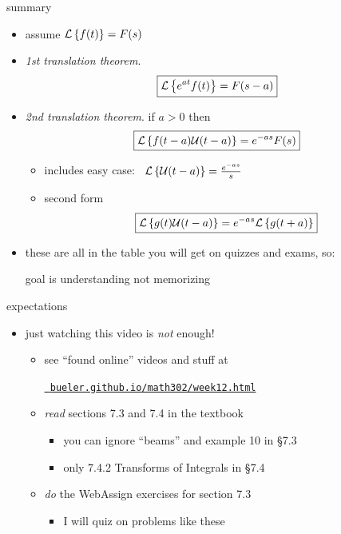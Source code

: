 \documentclass[urlcolor=blue,dvipsnames]{beamer}
\begin{document}
\begin{frame}{summary}

\begin{itemize}
\item assume $\mathcal{L}\left\{f(t)\right\}=F(s)$
\item \emph{1st translation theorem}.
    $$\boxed{\mathcal{L}\left\{e^{at} f(t)\right\} = F(s-a)}$$
\item \emph{2nd translation theorem}.  if $a>0$ then
    $$\boxed{\mathcal{L}\left\{f(t-a) \mathcal{U}(t-a)\right\} = e^{-as} F(s)}$$

\vspace{-2mm}
    \begin{itemize}
    \item includes easy case: \, $\mathcal{L}\left\{\mathcal{U}(t-a)\right\} = \frac{e^{-as}}{s}$
    \item second form
        $$\boxed{\mathcal{L}\left\{g(t) \mathcal{U}(t-a)\right\} = e^{-as} \mathcal{L}\left\{g(t+a)\right\}}$$
    \end{itemize}

\medskip
\item these are all in the table you will get on quizzes and exams, so:

\centerline{\alert{goal is understanding not memorizing}}
\end{itemize}
\end{frame}


\begin{frame}{expectations}

\begin{itemize}
\item just watching this video is \emph{not} enough!
     \begin{itemize}
     \item see ``found online'' videos and stuff at

     \centerline{\href{https://bueler.github.io/math302/week12.html}{\tt \color{cyan} bueler.github.io/math302/week12.html}}
     \item \emph{read} sections 7.3 and 7.4 in the textbook
         \begin{itemize}
         \item you can ignore ``beams'' and example 10 in \S7.3
         \item only 7.4.2 Transforms of Integrals in \S7.4
         \end{itemize}
     \item \emph{do} the WebAssign exercises for section 7.3
         \begin{itemize}
         \item I will quiz on problems like these
         \end{itemize}
     \end{itemize}
\end{itemize}
\end{frame}
\end{document}
